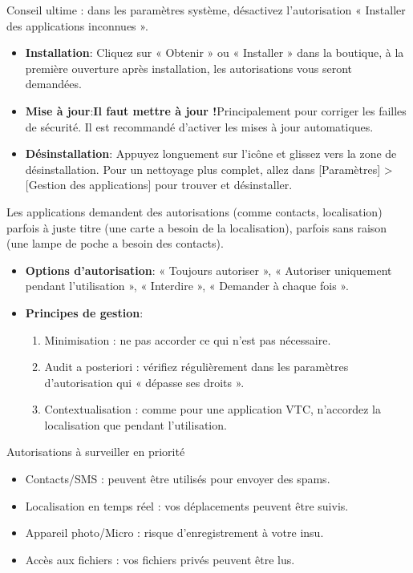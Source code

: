Conseil ultime : dans les paramètres système, désactivez l'autorisation « Installer des applications inconnues ».


\begin{itemize}
  \item \textbf{Installation}: Cliquez sur « Obtenir » ou « Installer » dans la boutique, à la première ouverture après installation, les autorisations vous seront demandées.
  \item \textbf{Mise à jour}:\textbf{Il faut mettre à jour !}Principalement pour corriger les failles de sécurité. Il est recommandé d'activer les mises à jour automatiques.
  \item \textbf{Désinstallation}: Appuyez longuement sur l'icône et glissez vers la zone de désinstallation. Pour un nettoyage plus complet, allez dans [Paramètres] > [Gestion des applications] pour trouver et désinstaller.
\end{itemize}


Les applications demandent des autorisations (comme contacts, localisation) parfois à juste titre (une carte a besoin de la localisation), parfois sans raison (une lampe de poche a besoin des contacts).

\begin{itemize}
  \item \textbf{Options d'autorisation}: « Toujours autoriser », « Autoriser uniquement pendant l'utilisation », « Interdire », « Demander à chaque fois ».
  \item \textbf{Principes de gestion}:
  \begin{enumerate}
    \item Minimisation : ne pas accorder ce qui n'est pas nécessaire.
    \item Audit a posteriori : vérifiez régulièrement dans les paramètres d'autorisation qui « dépasse ses droits ».
    \item Contextualisation : comme pour une application VTC, n'accordez la localisation que pendant l'utilisation.
  \end{enumerate}
\end{itemize}

\begin{tcbwarn}{Autorisations à surveiller en priorité}
\begin{itemize}
  \item Contacts/SMS : peuvent être utilisés pour envoyer des spams.
  \item Localisation en temps réel : vos déplacements peuvent être suivis.
  \item Appareil photo/Micro : risque d'enregistrement à votre insu.
  \item Accès aux fichiers : vos fichiers privés peuvent être lus.
\end{itemize}

\end{tcbwarn}

